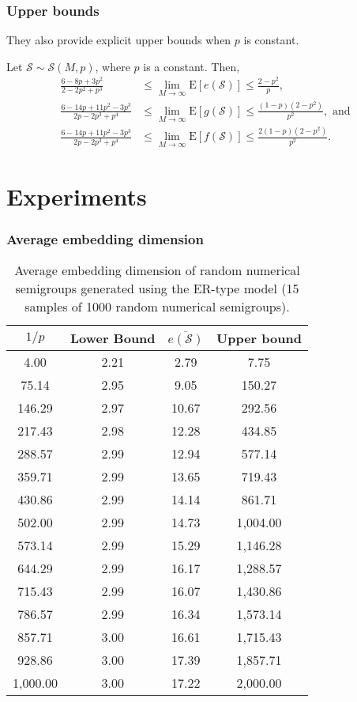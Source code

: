\documentclass{beamer}
\def\EE{\ensuremath{\mathrm{E}}}
\begin{document}
\begin{frame}
    \frametitle{Upper bounds}
    They also provide explicit upper bounds when $p$ is constant.
    \begin{theorem}
        Let $\mathcal{S} \sim \mathcal{S}(M, p)$, where $p$ is a constant. Then, 
        \begin{align*}
            \frac{6 - 8p + 3p^2}{2 - 2p^2 + p^3} &\leq \lim_{M \to \infty} \EE[e(\mathcal{S})] \leq \frac{2 - p^2}{p}, \\
            \frac{6 - 14p + 11p^2 - 3p^3}{2p - 2p^3 + p^4} &\leq \lim_{M \to \infty} \EE[g(\mathcal{S})] \leq \frac{(1 - p)(2 - p^2)}{p^2}, \text{ and}\\
            \frac{6 - 14p + 11p^2 - 3p^3}{2p - 2p^3 + p^4} &\leq \lim_{M \to \infty} \EE[f(\mathcal{S})] \leq \frac{2(1 - p)(2 - p^2)}{p^2}.
        \end{align*}
    \end{theorem}
\end{frame}
    
\section{Experiments}


\begin{frame}
\fontsize{10pt}{7.2}\selectfont
\frametitle{Average embedding dimension}
\begin{table}
    \centering
    \begin{tabular}{|c|c|c|c|}
        \hline
        $1/p$ & Lower Bound & $\overline{e(\mathcal{S})}$  & Upper bound \\
        \hline
        4.00 & 2.21 & 2.79 & 7.75 \\
        75.14 & 2.95 & 9.05 & 150.27 \\
        146.29 & 2.97 & 10.67 & 292.56 \\
        217.43 & 2.98 & 12.28 & 434.85 \\
        288.57 & 2.99 & 12.94 & 577.14 \\
        359.71 & 2.99 & 13.65 & 719.43 \\
        430.86 & 2.99 & 14.14 & 861.71 \\
        502.00 & 2.99 & 14.73 & 1,004.00 \\
        573.14 & 2.99 & 15.29 & 1,146.28 \\
        644.29 & 2.99 & 16.17 & 1,288.57 \\
        715.43 & 2.99 & 16.07 & 1,430.86 \\
        786.57 & 2.99 & 16.34 & 1,573.14 \\
        857.71 & 3.00 & 16.61 & 1,715.43 \\
        928.86 & 3.00 & 17.39 & 1,857.71 \\
        1,000.00 & 3.00 & 17.22 & 2,000.00 \\
        \hline
    \end{tabular}
    \caption{Average embedding dimension of random numerical semigroups generated using the ER-type model (15 samples of 1000 random numerical semigroups).}
    \label{tab:embedding}
    \end{table}
\end{frame}
\end{document}
